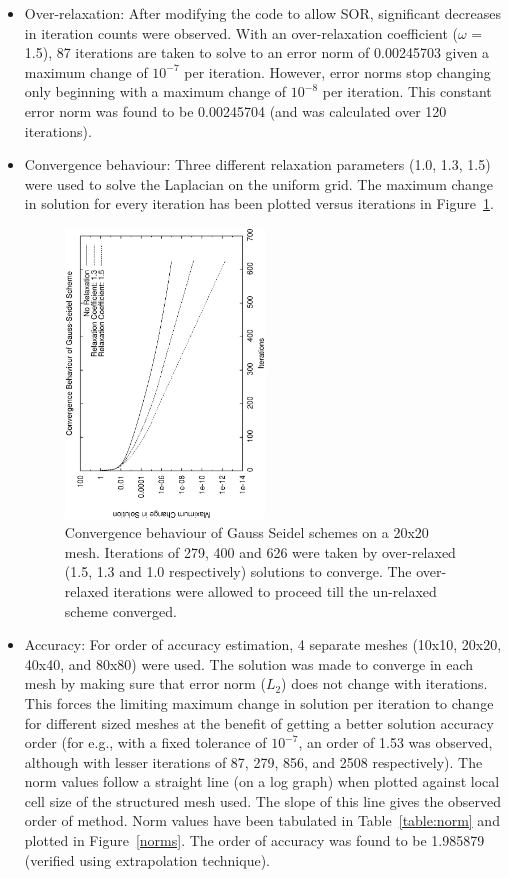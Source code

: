 \documentclass[a4paper,10pt]{article}
\begin{document}
\begin{itemize}
  \item Over-relaxation: After modifying the code to allow SOR, significant decreases in iteration counts were observed. With an over-relaxation coefficient ($\omega$ = 1.5), 87 iterations are taken to solve to an error norm of 0.00245703 given a maximum change of $10^{-7}$ per iteration. However, error norms stop changing only beginning with a maximum change of $10^{-8}$ per iteration. This constant error norm was found to be 0.00245704 (and was calculated over 120 iterations).
    
  \item Convergence behaviour: Three different relaxation parameters (1.0, 1.3, 1.5) were used to solve the Laplacian on the uniform grid. The maximum change in solution for every iteration has been plotted versus iterations in Figure~\ref{sor}.
    
    \begin{figure}
      \centering
      \includegraphics[width=0.5\textwidth, angle = -90]{../plots/mesh2/sor}
      \caption{Convergence behaviour of Gauss Seidel schemes on a 20x20 mesh. Iterations of 279, 400 and 626 were taken by over-relaxed (1.5, 1.3 and 1.0 respectively) solutions to converge. The over-relaxed iterations were allowed to proceed till the un-relaxed scheme converged.}          
      \label{sor}
    \end{figure}
    
  \item Accuracy: For order of accuracy estimation, 4 separate meshes (10x10, 20x20, 40x40, and 80x80) were used. The solution was made to converge in each mesh by making sure that error norm ($L_2$) does not change with iterations. This forces the limiting maximum change in solution per iteration to change for different sized meshes at the benefit of getting a better solution accuracy order (for e.g., with a fixed tolerance of $10^{-7}$, an order of 1.53 was observed, although with lesser iterations of 87, 279, 856, and 2508 respectively). The norm values follow a straight line (on a log graph) when plotted against local cell size of the structured mesh used. The slope of this line gives the observed order of method. Norm values have been tabulated in Table~\ref{table:norm} and plotted in Figure~\ref{norms}. The order of accuracy was found to be 1.985879 (verified using extrapolation technique).


\end{itemize}
\end{document}
